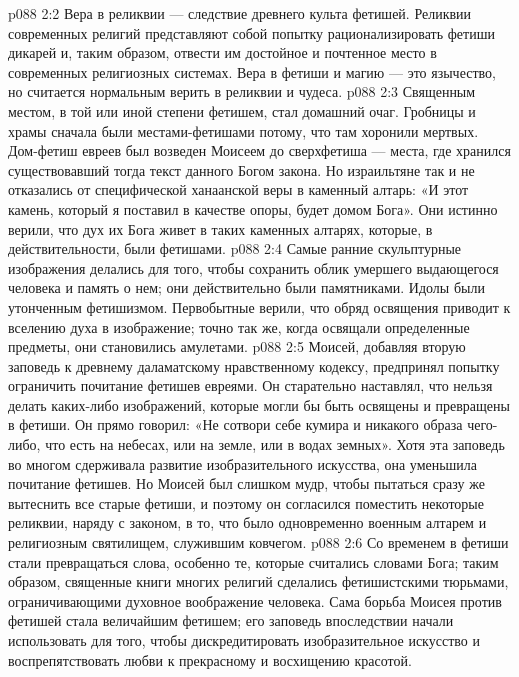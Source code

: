 \vs p088 2:2 Вера в реликвии --- следствие древнего культа фетишей. Реликвии современных религий представляют собой попытку рационализировать фетиши дикарей и, таким образом, отвести им достойное и почтенное место в современных религиозных системах. Вера в фетиши и магию --- это язычество, но считается нормальным верить в реликвии и чудеса.
\vs p088 2:3 Священным местом, в той или иной степени фетишем, стал домашний очаг. Гробницы и храмы сначала были местами\hyp{}фетишами потому, что там хоронили мертвых. Дом\hyp{}фетиш евреев был возведен Моисеем до сверхфетиша --- места, где хранился существовавший тогда текст данного Богом закона. Но израильтяне так и не отказались от специфической ханаанской веры в каменный алтарь: «И этот камень, который я поставил в качестве опоры, будет домом Бога». Они истинно верили, что дух их Бога живет в таких каменных алтарях, которые, в действительности, были фетишами.
\vs p088 2:4 \pc Самые ранние скульптурные изображения делались для того, чтобы сохранить облик умершего выдающегося человека и память о нем; они действительно были памятниками. Идолы были утонченным фетишизмом. Первобытные верили, что обряд освящения приводит к вселению духа в изображение; точно так же, когда освящали определенные предметы, они становились амулетами.
\vs p088 2:5 Моисей, добавляя вторую заповедь к древнему даламатскому нравственному кодексу, предпринял попытку ограничить почитание фетишев евреями. Он старательно наставлял, что нельзя делать каких\hyp{}либо изображений, которые могли бы быть освящены и превращены в фетиши. Он прямо говорил: «Не сотвори себе кумира и никакого образа чего\hyp{}либо, что есть на небесах, или на земле, или в водах земных». Хотя эта заповедь во многом сдерживала развитие изобразительного искусства, она уменьшила почитание фетишев. Но Моисей был слишком мудр, чтобы пытаться сразу же вытеснить все старые фетиши, и поэтому он согласился поместить некоторые реликвии, наряду с законом, в то, что было одновременно военным алтарем и религиозным святилищем, служившим ковчегом.
\vs p088 2:6 \pc Со временем в фетиши стали превращаться слова, особенно те, которые считались словами Бога; таким образом, священные книги многих религий сделались фетишистскими тюрьмами, ограничивающими духовное воображение человека. Сама борьба Моисея против фетишей стала величайшим фетишем; его заповедь впоследствии начали использовать для того, чтобы дискредитировать изобразительное искусство и воспрепятствовать любви к прекрасному и восхищению красотой.
